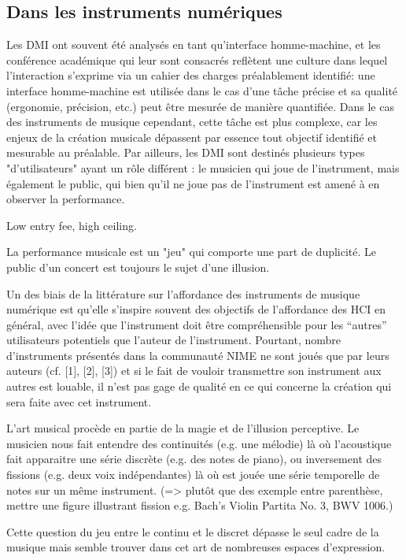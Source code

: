 \subsection{Dans les instruments numériques}


Les DMI ont souvent été analysés en tant qu'interface homme-machine, et les conférence académique qui leur sont consacrés reflètent une culture dans lequel l'interaction s'exprime via un cahier des charges préalablement identifié: une interface homme-machine est utilisée dans le cas d'une tâche précise et sa qualité (ergonomie, précision, etc.) peut être mesurée de manière quantifiée.
Dans le cas des instruments de musique cependant, cette tâche est plus complexe, car les enjeux de la création musicale dépassent par essence tout objectif identifié et mesurable au préalable. Par ailleurs, les DMI sont destinés plusieurs types "d'utilisateurs" ayant un rôle différent : le musicien qui joue de l'instrument, mais également le public, qui bien qu'il ne joue pas de l'instrument est amené à en observer la performance.

Low entry fee, high ceiling.

La performance musicale est un "jeu" qui comporte une part de duplicité. Le public d'un concert est toujours le sujet d'une illusion. 

Un des biais de la littérature sur l’affordance des instruments de musique numérique est qu’elle s’inspire souvent des objectifs de l’affordance des HCI en général, avec l’idée que l’instrument doit être compréhensible pour les “autres” utilisateurs potentiels que l’auteur de l’instrument. Pourtant, nombre d’instruments présentés dans la communauté NIME ne sont joués que par leurs auteurs (cf. [1], [2], [3]) et si le fait de vouloir transmettre son instrument aux autres est louable, il n’est pas gage de qualité en ce qui concerne la création qui sera faite avec cet instrument.     


L'art musical procède en partie de la magie et de l'illusion perceptive. Le musicien nous fait entendre des continuités (e.g. une mélodie) là où l'acoustique fait apparaitre une série discrète (e.g. des notes de piano), ou inversement des fissions (e.g. deux voix indépendantes) là où est jouée une série temporelle de notes sur un même instrument. (=> plutôt que des exemple entre parenthèse, mettre une figure illustrant fission e.g. Bach's Violin Partita No. 3, BWV 1006.)

Cette question du jeu entre le continu et le discret dépasse le seul cadre de la musique mais semble trouver dans cet art de nombreuses espaces d'expression.

